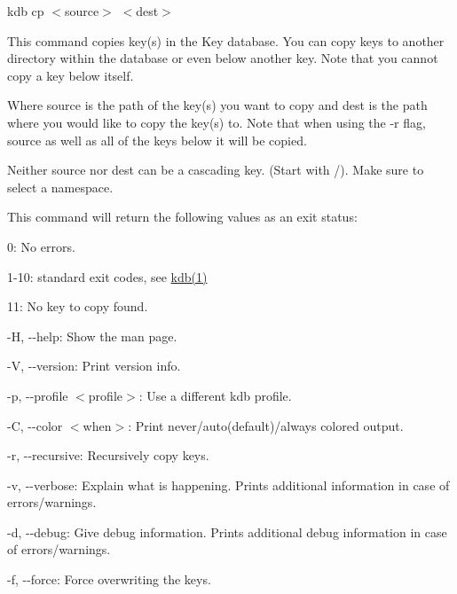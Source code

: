 {\ttfamily kdb cp $<$source$>$ $<$dest$>$}

This command copies key(s) in the Key database. You can copy keys to another directory within the database or even below another key. Note that you cannot copy a key below itself.

Where {\ttfamily source} is the path of the key(s) you want to copy and {\ttfamily dest} is the path where you would like to copy the key(s) to. Note that when using the {\ttfamily -\/r} flag, {\ttfamily source} as well as all of the keys below it will be copied.

Neither {\ttfamily source} nor {\ttfamily dest} can be a cascading key. (Start with {\ttfamily /}). Make sure to select a namespace.

This command will return the following values as an exit status\+:


\begin{DoxyItemize}
\item 0\+: No errors.
\item 1-\/10\+: standard exit codes, see \mbox{\hyperlink{doc_help_kdb_md}{kdb(1)}}
\item 11\+: No key to copy found.
\end{DoxyItemize}


\begin{DoxyItemize}
\item {\ttfamily -\/H}, {\ttfamily -\/-\/help}\+: Show the man page.
\item {\ttfamily -\/V}, {\ttfamily -\/-\/version}\+: Print version info.
\item {\ttfamily -\/p}, {\ttfamily -\/-\/profile $<$profile$>$}\+: Use a different kdb profile.
\item {\ttfamily -\/C}, {\ttfamily -\/-\/color $<$when$>$}\+: Print never/auto(default)/always colored output.
\item {\ttfamily -\/r}, {\ttfamily -\/-\/recursive}\+: Recursively copy keys.
\item {\ttfamily -\/v}, {\ttfamily -\/-\/verbose}\+: Explain what is happening. Prints additional information in case of errors/warnings.
\item {\ttfamily -\/d}, {\ttfamily -\/-\/debug}\+: Give debug information. Prints additional debug information in case of errors/warnings.
\item {\ttfamily -\/f}, {\ttfamily -\/-\/force}\+: Force overwriting the keys.
\end{DoxyItemize}


